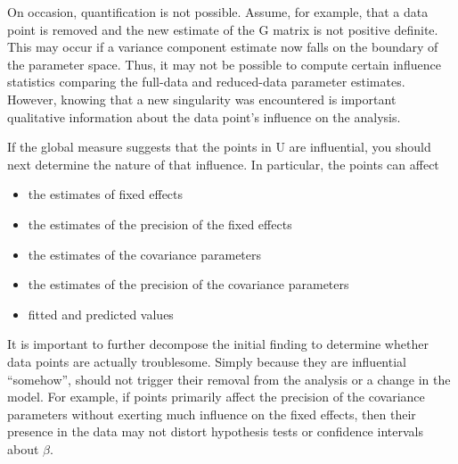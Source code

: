 \documentclass[12pt, a4paper]{article}
\begin{document}
			
			
			On occasion, quantification is not possible. Assume, for example, that a data point is removed
			and the new estimate of the G matrix is not positive definite. This may occur if a variance component
			estimate now falls on the boundary of the parameter space. Thus, it may not be possible to compute certain
			influence statistics comparing the full-data and reduced-data parameter estimates. However, knowing that
			a new singularity was encountered is important qualitative information about the data point’s influence on
			the analysis.
	
			If the global measure suggests that the points in U are influential, you should next determine the nature of
			that influence. In particular, the points can affect
			\begin{itemize}
				\item the estimates of fixed effects
				\item the estimates of the precision of the fixed effects
				\item the estimates of the covariance parameters
				\item the estimates of the precision of the covariance parameters
				\item fitted and predicted values
			\end{itemize}
			
			It is important to further decompose the initial finding to determine whether data points are actually troublesome.
			Simply because they are influential “somehow”, should not trigger their removal from the analysis or
			a change in the model. For example, if points primarily affect the precision of the covariance parameters
			without exerting much influence on the fixed effects, then their presence in the data may not distort hypothesis
			tests or confidence intervals about $\beta$.
			
\end{document}
